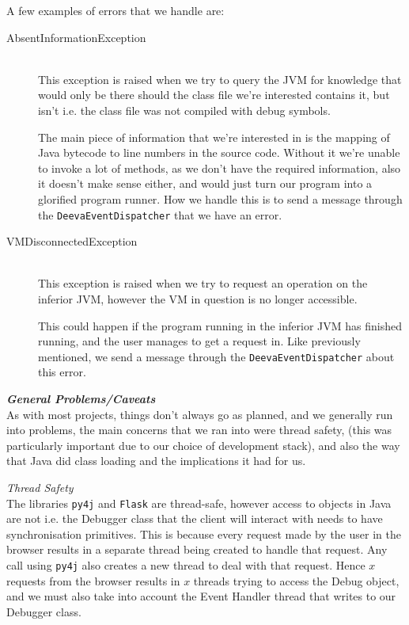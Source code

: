 \documentclass[11pt, a4paper]{article}
\begin{document}
A few examples of errors that we handle are:
\begin{description}
  \item[AbsentInformationException]\hfill\\
    This exception is raised when we try to query the JVM for knowledge that would only be there should the class file we're interested contains it, but isn't i.e. the class file was not compiled with debug symbols.

    The main piece of information that we're interested in is the mapping of Java bytecode to line numbers in the source code.
    Without it we're unable to invoke a lot of methods, as we don't have the required information, also it doesn't make sense either, and would just turn our program into a glorified program runner.
    How we handle this is to send a message through the \texttt{DeevaEventDispatcher} that we have an error.

  \item[VMDisconnectedException]\hfill\\
    This exception is raised when we try to request an operation on the inferior JVM, however the VM in question is no longer accessible.

    This could happen if the program running in the inferior JVM has finished running, and the user manages to get a request in.
    Like previously mentioned, we send a message through the \texttt{DeevaEventDispatcher} about this error.
\end{description}

\textbf{\emph{General Problems/Caveats}}\\
As with most projects, things don't always go as planned, and we generally run into problems, the main concerns that we ran into were thread safety, (this was particularly important due to our choice of development stack), and also the way that Java did class loading and the implications it had for us.

\emph{Thread Safety}\\
The libraries \texttt{py4j} and \texttt{Flask} are thread-safe, however access to objects in Java are not i.e. the Debugger class that the client will interact with needs to have synchronisation primitives.
This is because every request made by the user in the browser results in a separate thread being created to handle that request.
Any call using \texttt{py4j} also creates a new thread to deal with that request.
Hence $x$ requests from the browser results in $x$ threads trying to access the Debug object, and we must also take into account the Event Handler thread that writes to our Debugger class.
\end{document}
